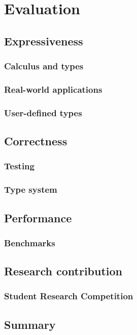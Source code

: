 \chapter{Evaluation}

\section{Expressiveness}

\subsection{Calculus and types}

\subsection{Real-world applications}

\subsection{User-defined types}

\section{Correctness}

\subsection{Testing}

\subsection{Type system}


\section{Performance}

\subsection{Benchmarks}

\section{Research contribution}

\subsection{Student Research Competition}

\section{Summary}
